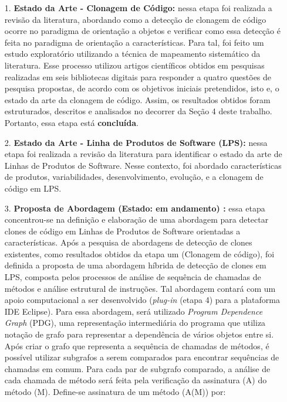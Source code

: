 \begin{itemize}
	\item[1.] \textbf{Estado da Arte - Clonagem de Código:} nessa etapa foi realizada a revisão da literatura, abordando como a detecção de clonagem de código ocorre no paradigma de orientação a objetos e verificar como essa detecção é feita no paradigma de orientação a características. Para tal, foi feito um estudo exploratório utilizando a técnica de mapeamento sistemático da literatura. Esse processo utilizou artigos científicos obtidos em pesquisas realizadas em seis bibliotecas digitais para responder a quatro questões de pesquisa propostas, de acordo com os objetivos iniciais pretendidos, isto e, o estado da arte da clonagem de código. Assim, os resultados obtidos foram estruturados, descritos e analisados no decorrer da Seção 4 deste trabalho. Portanto, essa etapa está \textbf{concluída}.
	
	\item[2.] \textbf{Estado da Arte - Linha de Produtos de Software (LPS):} nessa etapa foi realizada a revisão da literatura para identificar o estado da arte de Linhas de Produtos de Software. Nesse contexto, foi abordado características de produtos, variabilidades, desenvolvimento, evolução, e a clonagem de código em LPS.
		
	\item[3.] \textbf{Proposta de Abordagem (Estado: em andamento) :} essa etapa concentrou-se na definição e elaboração de uma abordagem para detectar clones de código em Linhas de Produtos de Software orientadas a características. Após a pesquisa de abordagens de detecção de clones existentes, como resultados obtidos da etapa um (Clonagem de código), foi definida a proposta de uma abordagem híbrida de detecção de clones em LPS, composta pelos processos de análise de sequência de chamadas de métodos e análise estrutural de instruções. Tal abordagem contará com um apoio computacional a ser desenvolvido (\textit{plug-in} (etapa 4) para a plataforma IDE Eclipse). Para essa abordagem, será utilizado \textit{Program Dependence Graph} (PDG), uma representação intermediária do programa que utiliza notação de grafo para representar a dependência de vários objetos entre si. Após criar o grafo que representa a sequência de chamadas de métodos, é possível utilizar subgrafos a serem comparados para encontrar sequências de chamadas em comum. Para cada par de subgrafo comparado, a análise de cada chamada de método será feita pela verificação da assinatura (A) do método (M). Define-se assinatura de um método (A(M)) por:
	

\end{itemize}
